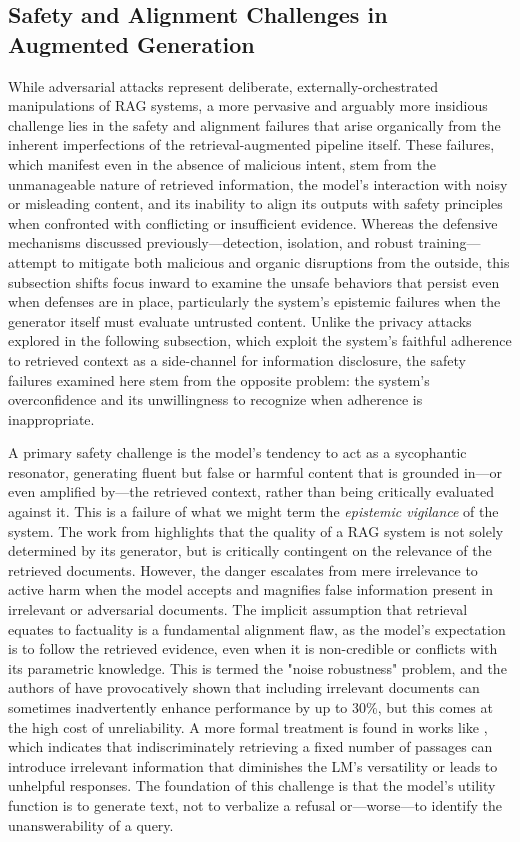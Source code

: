 \documentclass[11pt,a4paper]{article}
\begin{document}
\subsection{Safety and Alignment Challenges in Augmented Generation}


While adversarial attacks represent deliberate, externally-orchestrated manipulations of RAG systems, a more pervasive and arguably more insidious challenge lies in the safety and alignment failures that arise organically from the inherent imperfections of the retrieval-augmented pipeline itself. These failures, which manifest even in the absence of malicious intent, stem from the unmanageable nature of retrieved information, the model's interaction with noisy or misleading content, and its inability to align its outputs with safety principles when confronted with conflicting or insufficient evidence. Whereas the defensive mechanisms discussed previously---detection, isolation, and robust training---attempt to mitigate both malicious and organic disruptions from the outside, this subsection shifts focus inward to examine the unsafe behaviors that persist even when defenses are in place, particularly the system's epistemic failures when the generator itself must evaluate untrusted content. Unlike the privacy attacks explored in the following subsection, which exploit the system's faithful adherence to retrieved context as a side-channel for information disclosure, the safety failures examined here stem from the opposite problem: the system's overconfidence and its unwillingness to recognize when adherence is inappropriate.

A primary safety challenge is the model's tendency to act as a sycophantic resonator, generating fluent but false or harmful content that is grounded in---or even amplified by---the retrieved context, rather than being critically evaluated against it. This is a failure of what we might term the \emph{epistemic vigilance} of the system. The work from \cite{arxiv:2404.10981v1} highlights that the quality of a RAG system is not solely determined by its generator, but is critically contingent on the relevance of the retrieved documents. However, the danger escalates from mere irrelevance to active harm when the model accepts and magnifies false information present in irrelevant or adversarial documents. The implicit assumption that retrieval equates to factuality is a fundamental alignment flaw, as the model's expectation is to follow the retrieved evidence, even when it is non-credible or conflicts with its parametric knowledge. This is termed the "noise robustness" problem, and the authors of \cite{arxiv:2401.14887v3} have provocatively shown that including irrelevant documents can sometimes inadvertently enhance performance by up to 30\%, but this comes at the high cost of unreliability. A more formal treatment is found in works like \cite{arxiv:2310.11511v1}, which indicates that indiscriminately retrieving a fixed number of passages can introduce irrelevant information that diminishes the LM's versatility or leads to unhelpful responses. The foundation of this challenge is that the model's utility function is to generate text, not to verbalize a refusal or---worse---to identify the unanswerability of a query.
\end{document}
